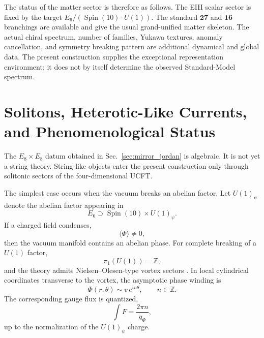 \documentclass[aps,prd,preprint,longbibliography,nofootinbib,superscriptaddress,floatfix]{revtex4-2}
\newcommand{\Spin}{\operatorname{Spin}}
\begin{document}
The status of the matter sector is therefore as follows. The EIII scalar sector
is fixed by the target \(E_6/(\Spin(10)\cdot U(1))\). The standard
\(\mathbf{27}\) and \(\mathbf{16}\) branchings are available and give the usual
grand-unified matter skeleton. The actual chiral spectrum, number of families,
Yukawa textures, anomaly cancellation, and symmetry breaking pattern are
additional dynamical and global data. The present construction supplies the
exceptional representation environment; it does not by itself determine the
observed Standard-Model spectrum.


\section{Solitons, Heterotic-Like Currents, and Phenomenological Status}
\label{sec:solitons}

The \(E_8\times E_8\) datum obtained in Sec.~\ref{sec:mirror_jordan} is
algebraic. It is not yet a string theory. String-like objects enter the present
construction only through solitonic sectors of the four-dimensional UCFT.

The simplest case occurs when the vacuum breaks an abelian factor. Let
\(U(1)_\psi\) denote the abelian factor appearing in
\[
    E_6\supset \Spin(10)\times U(1)_\psi .
\]
If a charged field condenses,
\begin{equation}
    \langle\Phi\rangle\neq 0,
    \label{eq:soliton_condensate}
\end{equation}
then the vacuum manifold contains an abelian phase. For complete breaking of a
\(U(1)\) factor,
\begin{equation}
    \pi_1(U(1))=\mathbb Z ,
    \label{eq:soliton_u1_pi1}
\end{equation}
and the theory admits Nielsen--Olesen-type vortex sectors
\cite{NielsenOlesen}. In local cylindrical coordinates transverse to the
vortex, the asymptotic phase winding is
\begin{equation}
    \Phi(r,\theta)
    \sim
    v\,e^{in\theta},
    \qquad
    n\in\mathbb Z .
    \label{eq:soliton_winding}
\end{equation}
The corresponding gauge flux is quantized,
\begin{equation}
    \int F
    =
    \frac{2\pi n}{q_\Phi},
    \label{eq:soliton_flux}
\end{equation}
up to the normalization of the \(U(1)_\psi\) charge.
\end{document}
